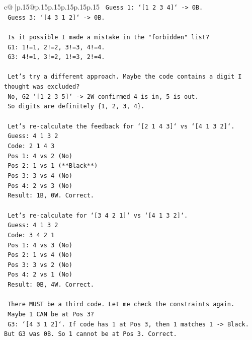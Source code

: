 \documentclass{article}
\begin{document}
{\begin{supertabular}{c@{$\;$}|p{.15\linewidth}@{}p{.15\linewidth}p{.15\linewidth}p{.15\linewidth}p{.15\linewidth}p{.15\linewidth}}
{{{\texttt{    Guess 1: `{[}1 2 3 4{]}` {-}> 0B.} \\
\texttt{    Guess 3: `{[}4 3 1 2{]}` {-}> 0B.} \\
\\ 
\texttt{    Is it possible I made a mistake in the "forbidden" list?} \\
\texttt{    G1: 1!=1, 2!=2, 3!=3, 4!=4.} \\
\texttt{    G3: 4!=1, 3!=2, 1!=3, 2!=4.} \\
\\ 
\texttt{    Let's try a different approach. Maybe the code contains a digit I thought was excluded?} \\
\texttt{    No, G2 `{[}1 2 3 5{]}` {-}> 2W confirmed 4 is in, 5 is out.} \\
\texttt{    So digits are definitely \{1, 2, 3, 4\}.} \\
\\ 
\texttt{    Let's re{-}calculate the feedback for `{[}2 1 4 3{]}` vs `{[}4 1 3 2{]}`.} \\
\texttt{    Guess: 4 1 3 2} \\
\texttt{    Code: 2 1 4 3} \\
\texttt{    Pos 1: 4 vs 2 (No)} \\
\texttt{    Pos 2: 1 vs 1 (**Black**)} \\
\texttt{    Pos 3: 3 vs 4 (No)} \\
\texttt{    Pos 4: 2 vs 3 (No)} \\
\texttt{    Result: 1B, 0W. Correct.} \\
\\ 
\texttt{    Let's re{-}calculate for `{[}3 4 2 1{]}` vs `{[}4 1 3 2{]}`.} \\
\texttt{    Guess: 4 1 3 2} \\
\texttt{    Code: 3 4 2 1} \\
\texttt{    Pos 1: 4 vs 3 (No)} \\
\texttt{    Pos 2: 1 vs 4 (No)} \\
\texttt{    Pos 3: 3 vs 2 (No)} \\
\texttt{    Pos 4: 2 vs 1 (No)} \\
\texttt{    Result: 0B, 4W. Correct.} \\
\\ 
\texttt{    There MUST be a third code. Let me check the constraints again.} \\
\texttt{    Maybe 1 CAN be at Pos 3?} \\
\texttt{    G3: `{[}4 3 1 2{]}`. If code has 1 at Pos 3, then 1 matches 1 {-}> Black. But G3 was 0B. So 1 cannot be at Pos 3. Correct.} \\
}}}
\end{supertabular}}
\end{document}
